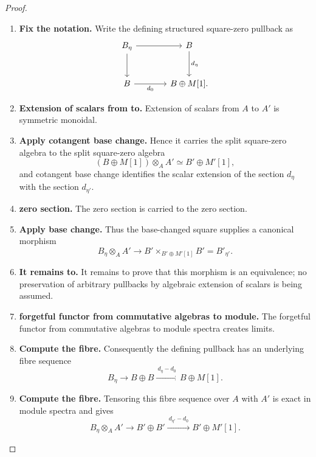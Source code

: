 \begin{proof}
\leavevmode
\begin{enumerate}[label=\textup{(\arabic*)}]
    \item \textbf{Fix the notation.}
    Write the defining structured square-zero pullback as
    \[
    \begin{tikzcd}[column sep=large,row sep=large]
        B_\eta \arrow[r] \arrow[d]
            & B \arrow[d,"d_\eta"]
        \\
        B \arrow[r,"d_0"']
            & B\oplus M[1].
    \end{tikzcd}
    \]

    \item \textbf{Extension of scalars from to.}
    Extension of scalars from \(A\) to \(A'\) is symmetric monoidal.

    \item \textbf{Apply cotangent base change.}
    Hence it carries the split square-zero algebra to the split square-zero algebra
    \[
        (B\oplus M[1])\otimes_AA'
        \simeq
        B'\oplus M'[1],
    \]
    and cotangent base change identifies the scalar extension of the section \(d_\eta\) with
    the section \(d_{\eta'}\).

    \item \textbf{zero section.}
    The zero section is carried to the zero section.

    \item \textbf{Apply base change.}
    Thus the base-changed square supplies a canonical morphism
    \[
        B_\eta\otimes_AA'
        \longrightarrow
        B'\times_{B'\oplus M'[1]}B'
        =B'_{\eta'}.
    \]

    \item \textbf{It remains to.}
    It remains to prove that this morphism is an equivalence; no preservation of arbitrary
    pullbacks by algebraic extension of scalars is being assumed.

    \item \textbf{forgetful functor from commutative algebras to module.}
    The forgetful functor from commutative algebras to module spectra creates limits.

    \item \textbf{Compute the fibre.}
    Consequently the defining pullback has an underlying fibre sequence
    \[
        B_\eta
        \longrightarrow
        B\oplus B
        \xrightarrow{\ d_\eta-d_0\ }
        B\oplus M[1].
    \]

    \item \textbf{Compute the fibre.}
    Tensoring this fibre sequence over \(A\) with \(A'\) is exact in module spectra
    and gives
    \[
        B_\eta\otimes_AA'
        \longrightarrow
        B'\oplus B'
        \xrightarrow{\ d_{\eta'}-d_0\ }
        B'\oplus M'[1].
    \]


\end{enumerate}
\end{proof}
